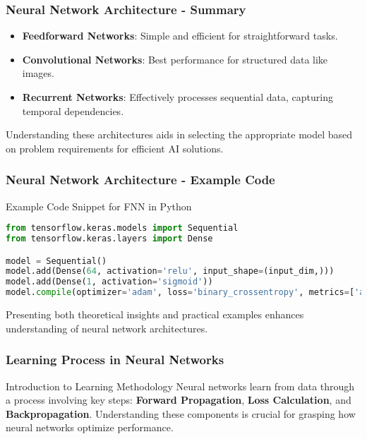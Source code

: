 \documentclass[aspectratio=169]{beamer}
\begin{document}
\begin{frame}[fragile]
    \frametitle{Neural Network Architecture - Summary}
    \begin{itemize}
        \item \textbf{Feedforward Networks}: Simple and efficient for straightforward tasks.
        \item \textbf{Convolutional Networks}: Best performance for structured data like images.
        \item \textbf{Recurrent Networks}: Effectively processes sequential data, capturing temporal dependencies.
    \end{itemize}
    Understanding these architectures aids in selecting the appropriate model based on problem requirements for efficient AI solutions.
\end{frame}

\begin{frame}[fragile]
    \frametitle{Neural Network Architecture - Example Code}
    \begin{block}{Example Code Snippet for FNN in Python}
    \begin{lstlisting}[language=Python]
from tensorflow.keras.models import Sequential
from tensorflow.keras.layers import Dense

model = Sequential()
model.add(Dense(64, activation='relu', input_shape=(input_dim,)))
model.add(Dense(1, activation='sigmoid'))
model.compile(optimizer='adam', loss='binary_crossentropy', metrics=['accuracy'])
    \end{lstlisting}
    \end{block}
    Presenting both theoretical insights and practical examples enhances understanding of neural network architectures.
\end{frame}

\begin{frame}[fragile]
    \frametitle{Learning Process in Neural Networks}
    
    \begin{block}{Introduction to Learning Methodology}
        Neural networks learn from data through a process involving key steps: 
        \textbf{Forward Propagation}, 
        \textbf{Loss Calculation}, 
        and 
        \textbf{Backpropagation}. 
        Understanding these components is crucial for grasping how neural networks optimize performance.
    \end{block}
\end{frame}
\end{document}
